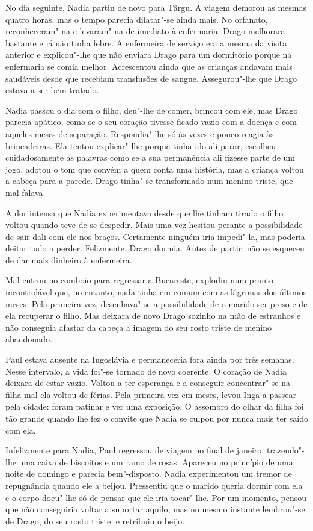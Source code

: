 No dia seguinte, Nadia partiu de novo para Târgu. A viagem demorou as
mesmas quatro horas, mas o tempo parecia dilatar"-se ainda mais. No
orfanato, reconheceram"-na e levaram"-na de imediato à enfermaria. Drago melhorara bastante e
já não tinha febre. A enfermeira de serviço era a mesma da visita
anterior e explicou"-lhe que não enviara Drago para um dormitório porque
na enfermaria se comia melhor. Acrescentou ainda que as crianças andavam mais saudáveis desde que recebiam transfusões de sangue.
Assegurou"-lhe que Drago estava a ser bem tratado.

Nadia passou o dia com
o filho, deu"-lhe de comer, brincou com ele, mas Drago parecia apático,
como se o seu coração tivesse ficado vazio com a doença e com aqueles
meses de separação. Respondia"-lhe só às vezes e pouco reagia às
brincadeiras. Ela tentou explicar"-lhe porque tinha ido ali parar,
escolheu cuidadosamente as palavras como se a sua permanência ali
fizesse parte de um jogo, adotou o tom que convém a quem conta uma
história, mas a criança voltou a cabeça para a parede. Drago tinha"-se
transformado num menino triste, que mal falava.

A dor intensa que Nadia experimentava desde que lhe tinham tirado o
filho voltou quando teve de se despedir. Mais uma vez hesitou perante a
possibilidade de sair dali com ele nos braços. Certamente ninguém iria
impedi"-la,
mas poderia deitar tudo a perder. Felizmente, Drago dormia. Antes de
partir, não se esqueceu de dar mais dinheiro à enfermeira.

Mal entrou no comboio para regressar a Bucareste, explodiu num pranto
incontrolável que, no entanto, nada tinha em comum com as lágrimas dos
últimos meses. Pela primeira vez, desenhava"-se a possibilidade de o
marido ser preso e de ela recuperar o filho. Mas deixara de novo Drago
sozinho na mão de estranhos e não conseguia afastar da cabeça a imagem
do seu rosto triste de menino abandonado.

Paul estava ausente na Iugoslávia e permaneceria fora ainda por três
semanas. Nesse intervalo, a vida foi"-se tornado de novo coerente. O
coração de Nadia deixara de estar vazio. Voltou a ter esperança e a
conseguir concentrar"-se na filha mal ela voltou de férias. Pela primeira vez em meses, levou
Inga a passear pela cidade: foram patinar e ver uma exposição. O
assombro do olhar da filha foi tão grande quando lhe fez o convite que
Nadia se culpou por nunca mais ter saído com ela.

Infelizmente para Nadia, Paul regressou de viagem no final de janeiro,
trazendo"-lhe uma caixa de biscoitos e um ramo de rosas. Apareceu no
princípio de uma noite de domingo e parecia bem"-disposto. Nadia
experimentou um tremor de repugnância quando ele a beijou. Pressentiu
que o marido queria dormir com ela e o corpo doeu"-lhe só de pensar que
ele iria tocar"-lhe. Por um momento, pensou que não conseguiria voltar a
suportar aquilo, mas no mesmo instante lembrou"-se de Drago, do seu rosto
triste, e retribuiu o beijo.

